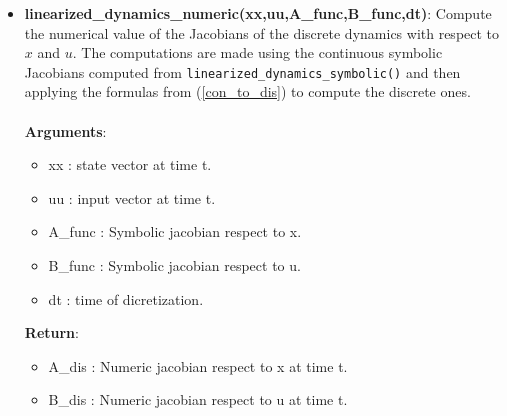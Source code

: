 \begin{itemize}
    \item \textbf{linearized\_dynamics\_numeric(xx,uu,A\_func,B\_func,dt)}: Compute the numerical value of the Jacobians of the discrete dynamics with respect to $x$ and $u$. The computations are made using the continuous symbolic Jacobians computed from \texttt{linearized\_dynamics\_symbolic()} and then applying the formulas from (\ref{con_to_dis}) to compute the discrete ones. \\\\
    \textbf{Arguments}:
    \begin{itemize}
        \item xx : state vector at time t.
        \item uu : input vector at time t.
        \item A\_func : Symbolic jacobian respect to x.
        \item B\_func : Symbolic jacobian respect to u.
        \item dt : time of dicretization.
    \end{itemize}
    \textbf{Return}:
    \begin{itemize}
        \item A\_dis : Numeric jacobian respect to x at time t.
        \item B\_dis : Numeric jacobian respect to u at time t.
    \end{itemize}
\end{itemize}